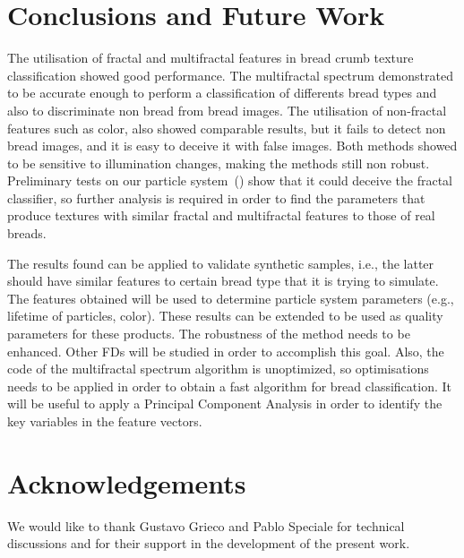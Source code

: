 \documentclass[oneside,a4paper,english,links]{amca}
\newcommand{\todo}[1]{\textbf{[TODO: #1]}}
\begin{document}

\section{Conclusions and Future Work}
The utilisation of fractal and multifractal features in bread crumb texture classification showed good performance. The multifractal spectrum demonstrated to be accurate enough to perform a classification of differents bread types and also to discriminate non bread from bread images. The utilisation of non-fractal features such as color, also showed comparable results, but it fails to detect non bread images, and it is easy to deceive it with false images. Both methods showed to be sensitive to illumination changes, making the methods still non robust. Preliminary tests on our particle system~(\cite{Baravalle2011}) show that it could deceive the fractal classifier, so further analysis is required in order to find the parameters that produce textures with similar fractal and multifractal features to those of real breads.

The results found can be applied to validate synthetic samples, i.e., the latter should have similar features to certain bread type that it is trying to simulate. The features obtained will be used to determine particle system parameters (e.g., lifetime of particles, color). These results can be extended to be used as quality parameters for these products. The robustness of the method needs to be enhanced. Other FDs will be studied in order to accomplish this goal. Also, the code of the multifractal spectrum algorithm is unoptimized, so optimisations needs to be applied in order to obtain a fast algorithm for bread classification. It will be useful to apply a Principal Component Analysis in order to identify the key variables in the feature vectors. 

\section{Acknowledgements}
We would like to thank Gustavo Grieco and Pablo Speciale for technical discussions and for their support in the development of the present work.

%

\end{document}
